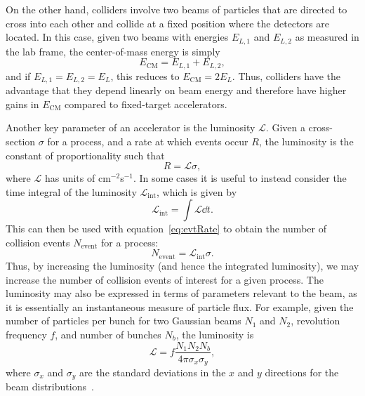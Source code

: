 On the other hand, colliders involve two beams of particles that are directed to cross into each other and collide at a fixed position where the detectors are located.
In this case, given two beams with energies $E_{L,1}$ and $E_{L,2}$ as measured in the lab frame, the center-of-mass energy is simply
\begin{equation}
  E_\mathrm{CM}=E_{L,1}+E_{L,2},
\end{equation}
and if $E_{L,1}=E_{L,2}=E_L$, this reduces to $E_\mathrm{CM}=2E_L$.
Thus, colliders have the advantage that they depend linearly on beam energy and therefore have higher gains in $E_\mathrm{CM}$ compared to fixed-target accelerators.

Another key parameter of an accelerator is the luminosity $\mathcal{L}$.
Given a cross-section $\sigma$ for a process, and a rate at which events occur $R$, the luminosity is the constant of proportionality such that
\begin{equation}\label{eq:evtRate}
  R=\mathcal{L}\sigma,
\end{equation}
where $\mathcal{L}$ has units of cm$^{-2}$s$^{-1}$. %
In some cases it is useful to instead consider the time integral of the luminosity $\mathcal{L}_\mathrm{int}$, which is given by
\begin{equation}
  \mathcal{L}_\mathrm{int}=\int\mathcal{L}\dd{t}.
\end{equation}
This can then be used with equation~\ref{eq:evtRate} to obtain the number of collision events $N_\mathrm{event}$ for a process:
\begin{equation}
  N_\mathrm{event}=\mathcal{L}_\mathrm{int}\sigma.
\end{equation}
Thus, by increasing the luminosity (and hence the integrated luminosity), we may increase the number of collision events of interest for a given process.
The luminosity may also be expressed in terms of parameters relevant to the beam, as it is essentially an instantaneous measure of particle flux. %
For example, given the number of particles per bunch for two Gaussian beams $N_1$ and $N_2$, revolution frequency $f$, and number of bunches $N_b$, the luminosity is
\begin{equation}
  \mathcal{L}=f\frac{N_1N_2N_b}{4\pi\sigma_x\sigma_y},
\end{equation}
where $\sigma_x$ and $\sigma_y$ are the standard deviations in the $x$ and $y$ directions for the beam distributions~\cite{Herr:941318}.


